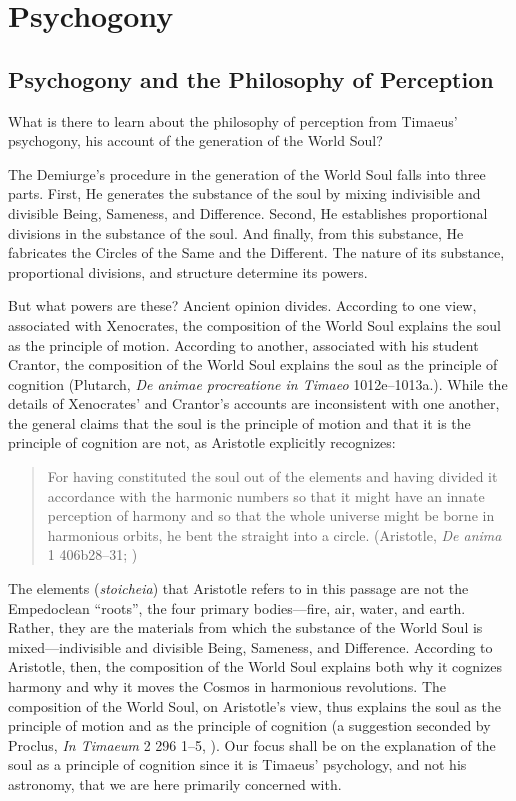 
\chapter{Psychogony} %
\label{cha:psychogony}

\section{Psychogony and the Philosophy of Perception} %
\label{sec:psychogony_and_the_philosophy_of_perception}

What is there to learn about the philosophy of perception from Timaeus' psychogony, his account of the generation of the World Soul? 

The Demiurge's procedure in the generation of the World Soul falls into three parts. First, He generates the substance of the soul by mixing indivisible and divisible Being, Sameness, and Difference. Second, He establishes proportional divisions in the substance of the soul. And finally, from this substance, He fabricates the Circles of the Same and the Different. The nature of its substance, proportional divisions, and structure determine its powers. 

But what powers are these? Ancient opinion divides. According to one view, associated with Xenocrates, the composition of the World Soul explains the soul as the principle of motion. According to another, associated with his student Crantor, the composition of the World Soul explains the soul as the principle of cognition (Plutarch, \emph{De animae procreatione in Timaeo} 1012e--1013a.). While the details of Xenocrates' and Crantor's accounts are inconsistent with one another, the general claims that the soul is the principle of motion and that it is the principle of cognition are not, as Aristotle explicitly recognizes:
\begin{quote}
	For having constituted the soul out of the elements and having divided it accordance with the harmonic numbers so that it might have an innate perception of harmony and so that the whole universe might be borne in harmonious orbits, he bent the straight into a circle. (Aristotle, \emph{De anima} 1 406b28--31; \citealt[10]{Shields:2016ix})
\end{quote}
The elements (\emph{stoicheia}) that Aristotle refers to in this passage are not the Empedoclean ``roots'', the four primary bodies---fire, air, water, and earth. Rather, they are the materials from which the substance of the World Soul is mixed---indivisible and divisible Being, Sameness, and Difference. According to Aristotle, then, the composition of the World Soul explains both why it cognizes harmony and why it moves the Cosmos in harmonious revolutions. The composition of the World Soul, on Aristotle's view, thus explains the soul as the principle of motion and as the principle of cognition (a suggestion seconded by Proclus, \emph{In Timaeum} 2 296 1--5, \citealt{Diehl:1903re}). Our focus shall be on the explanation of the soul as a principle of cognition since it is Timaeus' psychology, and not his astronomy, that we are here primarily concerned with.

